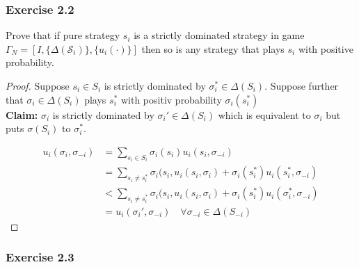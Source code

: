 \documentclass[12pt]{extreport} %
\theoremstyle{named}
\theoremstyle{itshape}
\theoremstyle{normal}
\begin{document}
\subsubsection*{Exercise 2.2} %

Prove that if pure strategy $s_i$ is a strictly dominated strategy in game $\Gamma_N = [I, \{ \Delta(\mathcal{S}_i)\}, \{u_i(\cdot)\}]$ then so is any strategy that plays $s_i$ with positive probability.

\begin{proof}
	Suppose $s_i \in S_i$ is strictly dominated by $\sigma_i^{*} \in \Delta(S_i)$. Suppose further that $\sigma_i \in \Delta(S_i)$ plays $s_i^{*}$ with positiv probability $\sigma_i(s_i^*)$ ~\\

	\textbf{Claim:} $\sigma_i$ is strictly dominated by $\sigma_i' \in \Delta(S_i)$ which is equivalent to $\sigma_i$ but puts $\sigma(S_i)$ to $\sigma_i^*$.


	\begin{align*}
		u_i(\sigma_i, \sigma_{-i}) & = \sum_{s_i \in S_i} \sigma_i(s_i) u_i(s_i, \sigma_{-i}) \\
		& = \sum_{s_i \neq s_i^*} \sigma_i(s_i, u_i(s_i, \sigma_i) + \sigma_i(s_i^*) u_i(s_i^*, \sigma_{-i}) \\
		& < \sum_{s_i \neq s_i^*} \sigma_i(s_i, u_i(s_i, \sigma_i) + \sigma_i(s_i^*) u_i(\sigma_i^*, \sigma_{-i}) \\
		& = u_i(\sigma_i', \sigma_{-i}) \quad \forall \sigma_{-i} \in \Delta(S_{-i})
	\end{align*}
\end{proof}

\subsubsection*{Exercise 2.3}
\end{document}
